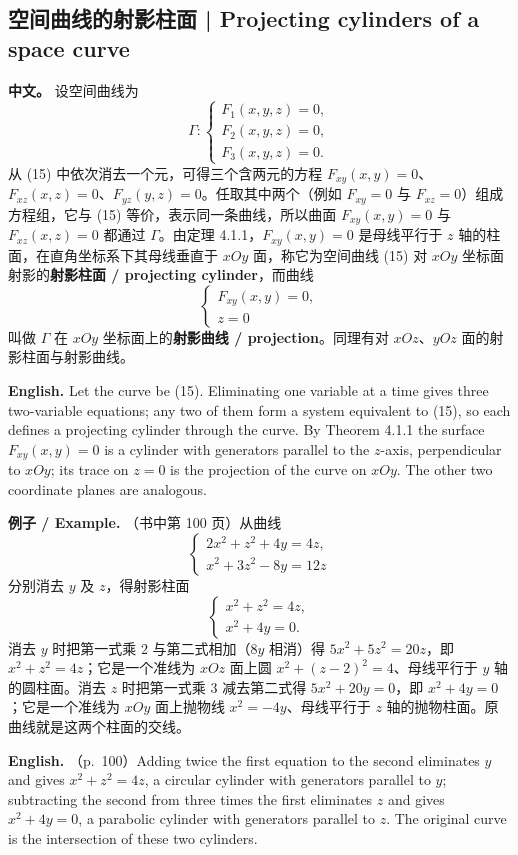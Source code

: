 \documentclass[UTF8,11pt,a4paper]{ctexart}
\newcommand{\APS}[2]{\par\noindent\textbf{中文。} #1\par\noindent\textbf{English.} #2\par\smallskip}
\newcommand{\EN}[1]{\par\noindent \textbf{English.} #1\par}
\newcommand{\EX}[2]{\par\noindent \textbf{例子 / Example.} #1\par\EN{#2}}
\theoremstyle{definition}
\begin{document}
\subsection{空间曲线的射影柱面 | Projecting cylinders of a space curve}
\APS{设空间曲线为
\[
\Gamma:\begin{cases}F_1(x,y,z)=0,\\ F_2(x,y,z)=0,\\ F_3(x,y,z)=0.\end{cases}\tag{15}
\]
从 (15) 中依次消去一个元，可得三个含两元的方程 $F_{xy}(x,y)=0$、$F_{xz}(x,z)=0$、$F_{yz}(y,z)=0$。任取其中两个（例如 $F_{xy}=0$ 与 $F_{xz}=0$）组成方程组，它与 (15) 等价，表示同一条曲线，所以曲面 $F_{xy}(x,y)=0$ 与 $F_{xz}(x,z)=0$ 都通过 $\Gamma$。由定理 4.1.1，$F_{xy}(x,y)=0$ 是母线平行于 $z$ 轴的柱面，在直角坐标系下其母线垂直于 $xOy$ 面，称它为空间曲线 (15) 对 $xOy$ 坐标面射影的\textbf{射影柱面 / projecting cylinder}，而曲线
\[
\begin{cases}F_{xy}(x,y)=0,\\ z=0\end{cases}
\]
叫做 $\Gamma$ 在 $xOy$ 坐标面上的\textbf{射影曲线 / projection}。同理有对 $xOz$、$yOz$ 面的射影柱面与射影曲线。}{Let the curve be (15). Eliminating one variable at a time gives three two-variable equations; any two of them form a system equivalent to (15), so each defines a projecting cylinder through the curve. By Theorem 4.1.1 the surface $F_{xy}(x,y)=0$ is a cylinder with generators parallel to the $z$-axis, perpendicular to $xOy$; its trace on $z=0$ is the projection of the curve on $xOy$. The other two coordinate planes are analogous.}

\EX{（书中第 100 页）从曲线
\[
\begin{cases}2x^2+z^2+4y=4z,\\ x^2+3z^2-8y=12z\end{cases}
\]
分别消去 $y$ 及 $z$，得射影柱面
\[
\begin{cases}x^2+z^2=4z,\\ x^2+4y=0.\end{cases}
\]
消去 $y$ 时把第一式乘 $2$ 与第二式相加（$8y$ 相消）得 $5x^2+5z^2=20z$，即 $x^2+z^2=4z$；它是一个准线为 $xOz$ 面上圆 $x^2+(z-2)^2=4$、母线平行于 $y$ 轴的圆柱面。消去 $z$ 时把第一式乘 $3$ 减去第二式得 $5x^2+20y=0$，即 $x^2+4y=0$；它是一个准线为 $xOy$ 面上抛物线 $x^2=-4y$、母线平行于 $z$ 轴的抛物柱面。原曲线就是这两个柱面的交线。}{（p.~100）Adding twice the first equation to the second eliminates $y$ and gives $x^2+z^2=4z$, a circular cylinder with generators parallel to $y$; subtracting the second from three times the first eliminates $z$ and gives $x^2+4y=0$, a parabolic cylinder with generators parallel to $z$. The original curve is the intersection of these two cylinders.}
\end{document}
